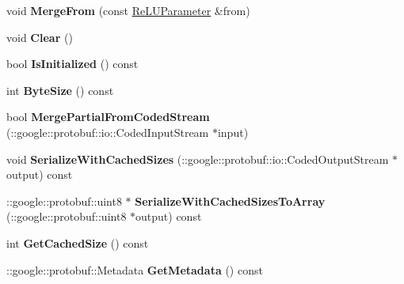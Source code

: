 \begin{DoxyCompactItemize}
\item 
\mbox{\label{classcaffe_1_1_re_l_u_parameter_a86cf4fc0954f01ad61bf7aa272b07596}} 
void {\bfseries Merge\+From} (const \mbox{\hyperlink{classcaffe_1_1_re_l_u_parameter}{Re\+L\+U\+Parameter}} \&from)
\item 
\mbox{\label{classcaffe_1_1_re_l_u_parameter_a6b2354e96f096f5fb089c177bc8e5d64}} 
void {\bfseries Clear} ()
\item 
\mbox{\label{classcaffe_1_1_re_l_u_parameter_a88aaf0b5014b7cf38f253a6ffc8fa08b}} 
bool {\bfseries Is\+Initialized} () const
\item 
\mbox{\label{classcaffe_1_1_re_l_u_parameter_ac9ed0c9a4f2603db0856f0fdf7a8bb63}} 
int {\bfseries Byte\+Size} () const
\item 
\mbox{\label{classcaffe_1_1_re_l_u_parameter_aed7d6691e29da5aba37528ea2fa297fa}} 
bool {\bfseries Merge\+Partial\+From\+Coded\+Stream} (\+::google\+::protobuf\+::io\+::\+Coded\+Input\+Stream $\ast$input)
\item 
\mbox{\label{classcaffe_1_1_re_l_u_parameter_a296a160746d29180581cfd3197e696b2}} 
void {\bfseries Serialize\+With\+Cached\+Sizes} (\+::google\+::protobuf\+::io\+::\+Coded\+Output\+Stream $\ast$output) const
\item 
\mbox{\label{classcaffe_1_1_re_l_u_parameter_a87c8d0cc8455d5e2a5cbdf0094d4a451}} 
\+::google\+::protobuf\+::uint8 $\ast$ {\bfseries Serialize\+With\+Cached\+Sizes\+To\+Array} (\+::google\+::protobuf\+::uint8 $\ast$output) const
\item 
\mbox{\label{classcaffe_1_1_re_l_u_parameter_a5293c8b50fa992f8847d18d0c6b7d36c}} 
int {\bfseries Get\+Cached\+Size} () const
\item 
\mbox{\label{classcaffe_1_1_re_l_u_parameter_af387506595bd3669c8b49364fc2b2b3a}} 
\+::google\+::protobuf\+::\+Metadata {\bfseries Get\+Metadata} () const

\end{DoxyCompactItemize}
